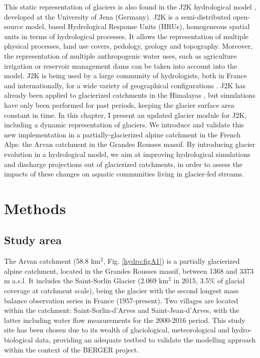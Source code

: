 This static representation of glaciers is also found in the J2K hydrological model \citep{krause_quantifying_2002}, developed at the University of Jena (Germany). J2K is a semi-distributed open-source model, based Hydrological Response Units (HRUs), homogeneous spatial units in terms of hydrological processes. It allows the representation of multiple physical processes, land use covers, pedology, geology and topography. Moreover, the representation of multiple anthropogenic water uses, such as agriculture irrigation or reservoir management dams can be taken into account into the model. J2K is being used by a large community of hydrologists, both in France and internationally, for a wide variety of geographical configurations \citep{krause_quantifying_2002, nepal_understanding_2014, braud_j2000-rhone_2017}. J2K has already been applied to glacierized catchments in the Himalayas \citep{nepal_understanding_2014}, but simulations have only been performed for past periods, keeping the glacier surface area constant in time. In this chapter, I present an updated glacier module for J2K, including a dynamic representation of glaciers. We introduce and validate this new implementation in a partially-glacierized alpine catchment in the French Alps: the Arvan catchment in the Grandes Rousses massif. By introducing glacier evolution in a hydrological model, we aim at improving hydrological simulations and discharge projections out of glacierized catchments, in order to assess the impacts of these changes on aquatic communities living in glacier-fed streams. 

\section{Methods}

\subsection{Study area}

The Arvan catchment (58.8 km$^{2}$, Fig. \ref{hydro:figA1}) is a partially glacierized alpine catchment, located in the Grandes Rousses massif, between 1368 and 3373 m a.s.l. It includes the Saint-Sorlin Glacier (2.069 km$^{2}$ in 2015, 3.5\% of glacial coverage at catchment scale), being the glacier with the second longest mass balance observation series in France (1957-present). Two villages are located within the catchment: Saint-Sorlin-d'Arves and Saint-Jean-d'Arves, with the latter including water flow measurements for the 2000-2016 period. This study site has been chosen due to its wealth of glaciological, meteorological and hydro-biological data, providing an adequate testbed to validate the modelling approach within the context of the BERGER project.

